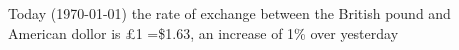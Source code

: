 \documentclass{book}
\begin{document}
Today (\today) the rate of exchange between the British
pound and American dollor is \pounds 1 =\$1.63, an
increase of 1\% over yesterday
\end{document}
